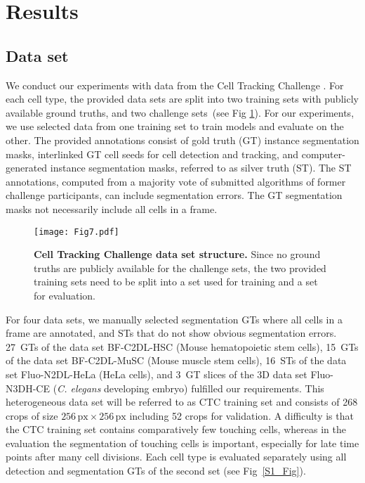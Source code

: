 \documentclass[10pt,letterpaper]{article}
\begin{document}
\section*{Results}
\subsection*{Data set}
We conduct our experiments with data from the Cell Tracking Challenge \cite{Ulman2017, Maska2014}. For each cell type, the provided data sets are split into two training sets with publicly available ground truths, and two challenge sets~(see Fig \ref{fig:ctc_data_structure}). For our experiments, we use selected data from one training set to train models and evaluate on the other. The provided annotations consist of gold truth (GT) instance segmentation masks, interlinked GT cell seeds for cell detection and tracking, and computer-generated instance segmentation masks, referred to as silver truth (ST). The ST annotations, computed from a majority vote of submitted algorithms of former challenge participants, can include segmentation errors. The GT segmentation masks not necessarily include all cells in a frame.
\begin{figure}
\centering
\texttt{[image: Fig7.pdf]}
\caption{\textbf{Cell Tracking Challenge data set structure.} Since no ground truths are publicly available for the challenge sets, the two provided training sets need to be split into a set used for training and a set for evaluation.}
\label{fig:ctc_data_structure}
\end{figure}

For four data sets, we manually selected segmentation GTs where all cells in a frame are annotated, and STs that do not show obvious segmentation errors. 27~GTs of the data set BF-C2DL-HSC (Mouse hematopoietic stem cells), 15~GTs of the data set BF-C2DL-MuSC (Mouse muscle stem cells), 16~STs of the data set Fluo-N2DL-HeLa (HeLa cells), and 3~GT slices of the 3D data set Fluo-N3DH-CE (\textit{C. elegans} developing embryo) fulfilled our requirements. This heterogeneous data set will be referred to as CTC training set and consists of 268 crops of size $256\,\text{px}\!\times\!256\,\text{px}$ including 52 crops for validation. A difficulty is that the CTC training set contains comparatively few touching cells, whereas in the evaluation the segmentation of touching cells is important, especially for late time points after many cell divisions. Each cell type is evaluated separately using all detection and segmentation GTs of the second set (see Fig~\ref{S1_Fig}).
\end{document}
